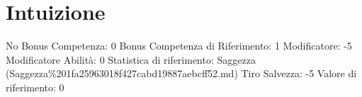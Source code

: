 \section{Intuizione}\label{intuizione}

\begin{description}
\tightlist
\item[Tags: ABI]
No Bonus Competenza: 0 Bonus Competenza di Riferimento: 1 Modificatore:
-5 Modificatore Abilità: 0 Statistica di riferimento: Saggezza
(Saggezza\%201fa25963018f427cabd19887aebcff52.md) Tiro Salvezza: -5
Valore di riferimento: 0
\end{description}
